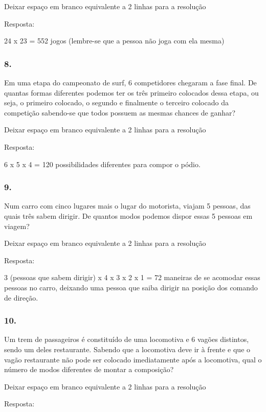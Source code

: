 Deixar espaço em branco equivalente a 2 linhas para a resolução

Resposta:

24 x 23 = 552 jogos (lembre-se que a pessoa não joga com ela mesma)

\subsubsection{8.}\label{section-137}

Em uma etapa do campeonato de surf, 6 competidores chegaram a fase
final. De quantas formas diferentes podemos ter os três primeiro
colocados dessa etapa, ou seja, o primeiro colocado, o segundo e
finalmente o terceiro colocado da competição sabendo-se que todos
possuem as mesmas chances de ganhar?

Deixar espaço em branco equivalente a 2 linhas para a resolução

Resposta:

6 x 5 x 4 = 120 possibilidades diferentes para compor o pódio.

\subsubsection{9.}\label{section-138}

Num carro com cinco lugares mais o lugar do motorista, viajam 5 pessoas,
das quais três sabem dirigir. De quantos modos podemos dispor essas 5
pessoas em viagem?

Deixar espaço em branco equivalente a 2 linhas para a resolução

Resposta:

3 (pessoas que sabem dirigir) x 4 x 3 x 2 x 1 = 72 maneiras de se
acomodar essas pessoas no carro, deixando uma pessoa que saiba dirigir
na posição dos comando de direção.

\subsubsection{10.}\label{section-139}

Um trem de passageiros é constituído de uma locomotiva e 6 vagões
distintos, sendo um deles restaurante. Sabendo que a locomotiva deve ir
à frente e que o vagão restaurante não pode ser colocado imediatamente
após a locomotiva, qual o número de modos diferentes de montar a
composição?

Deixar espaço em branco equivalente a 2 linhas para a resolução

Resposta:


